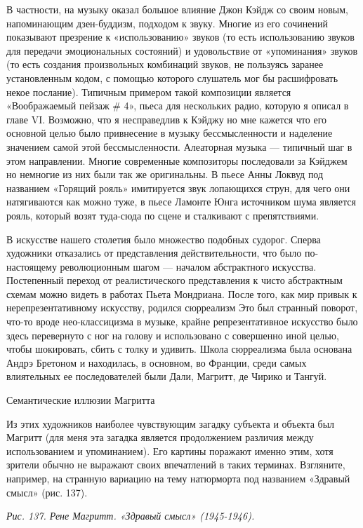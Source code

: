 В частности, на музыку оказал большое влияние Джон Кэйдж со своим новым, напоминающим дзен-буддизм, подходом к звуку. Многие из его сочинений показывают презрение к «использованию» звуков (то есть использованию звуков для передачи эмоциональных состояний) и удовольствие от «упоминания» звуков (то есть создания произвольных комбинаций звуков, не пользуясь заранее установленным кодом, с помощью которого слушатель мог бы расшифровать некое послание). Типичным примером такой композиции является «Воображаемый пейзаж \# 4», пьеса для нескольких радио, которую я описал в главе VI. Возможно, что я несправедлив к Кэйджу но мне кажется что его основной целью было привнесение в музыку бессмысленности и наделение значением самой этой бессмысленности. Алеаторная музыка --- типичный шаг в этом направлении. Многие современные композиторы последовали за Кэйджем но немногие из них были так же оригинальны. В пьесе Анны Локвуд под названием «Горящий рояль» имитируется звук лопающихся струн, для чего они натягиваются как можно туже, в пьесе Ламонте Юнга источником шума является рояль, который возят туда-сюда по сцене и сталкивают с препятствиями.

В искусстве нашего столетия было множество подобных судорог. Сперва художники отказались от представления действительности, что было по-настоящему революционным шагом --- началом абстрактного искусства. Постепенный переход от реалистического представления к чисто абстрактным схемам можно видеть в работах Пьета Мондриана. После того, как мир привык к нерепрезентативному искусству, родился сюрреализм Это был странный поворот, что-то вроде нео-классицизма в музыке, крайне репрезентативное искусство было здесь перевернуто с ног на голову и использовано с совершенно иной целью, чтобы шокировать, сбить с толку и удивить. Школа сюрреализма была основана Андрэ Бретоном и находилась, в основном, во Франции, среди самых влиятельных ее последователей были Дали, Магритт, де Чирико и Тангуй.

Семантические иллюзии Магритта

Из этих художников наиболее чувствующим загадку субъекта и объекта был Магритт (для меня эта загадка является продолжением различия между использованием и упоминанием). Его картины поражают именно этим, хотя зрители обычно не выражают своих впечатлений в таких терминах. Взгляните, например, на странную вариацию на тему натюрморта под названием «Здравый смысл» (рис. 137).

\emph{Рис. 137. Рене Магритт. «Здравый смысл» (1945-1946).}

